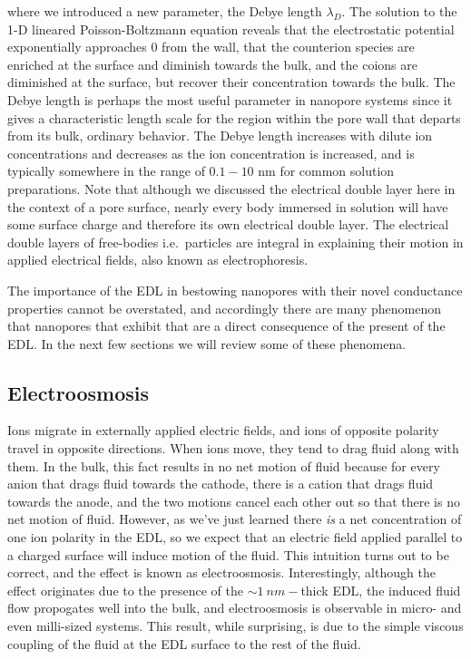 			
			where we introduced a new parameter, the Debye length $\lambda_{D}$. The solution to the 1-D lineared Poisson-Boltzmann equation reveals that the electrostatic potential exponentially approaches 0 from the wall, that the counterion species are enriched at the surface and diminish towards the bulk, and the coions are diminished at the surface, but recover their concentration towards the bulk. The Debye length is perhaps the most useful parameter in nanopore systems since it gives a characteristic length scale for the region within the pore wall that departs from its bulk, ordinary behavior. The Debye length increases with dilute ion concentrations and decreases as the ion concentration is increased, and is typically somewhere in the range of $0.1-10$ nm for common solution preparations. Note that although we discussed the electrical double layer here in the context of a pore surface, nearly every body immersed in solution will have some surface charge and therefore its own electrical double layer. The electrical double layers of free-bodies i.e.~particles are integral in explaining their motion in applied electrical fields, also known as electrophoresis. 
			
			The importance of the EDL in bestowing nanopores with their novel conductance properties cannot be overstated, and accordingly there are many phenomenon that nanopores that exhibit that are a direct consequence of the present of the EDL. In the next few sections we will review some of these phenomena.
			
			
		\subsection{Electroosmosis}
			
			Ions migrate in externally applied electric fields, and ions of opposite polarity travel in opposite directions. When ions move, they tend to drag fluid along with them. In the bulk, this fact results in no net motion of fluid because for every anion that drags fluid towards the cathode, there is a cation that drags fluid towards the anode, and the two motions cancel each other out so that there is no net motion of fluid. However, as we've just learned there \textit{is} a net concentration of one ion polarity in the EDL, so we expect that an electric field applied parallel to a charged surface will induce motion of the fluid. This intuition turns out to be correct, and the effect is known as electroosmosis. Interestingly, although the effect originates due to the presence of the $\sim \SI{1}{nm}-$thick EDL, the induced fluid flow propogates well into the bulk, and electroosmosis is observable in micro- and even milli-sized systems. This result, while surprising, is due to the simple viscous coupling of the fluid at the EDL surface to the rest of the fluid.
			
